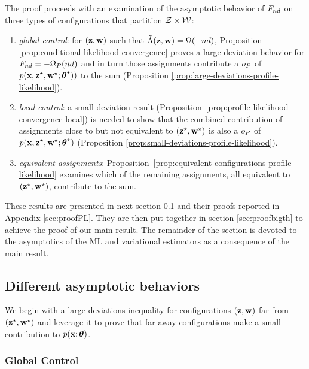 \documentclass[bj]{imsart}
\numberwithin{equation}{section}
\theoremstyle{plain}
\theoremstyle{remark}
\begin{document}
The proof proceeds with an examination of the asymptotic behavior of  $F_{nd}$ on three types of configurations that partition $\mathcal{Z}\times\mathcal{W}$:


\begin{enumerate}
\item  \emph{global control}: for $(\mathbf{z}, \mathbf{w})$ such that $\tilde{\Lambda}(\mathbf{z}, \mathbf{w}) = \Omega(-nd)$, Proposition \ref{prop:conditional-likelihood-convergence} proves a large deviation behavior for $F_{nd} = -\Omega_P(nd)$  and in turn those assignments contribute a $o_{P}$ of $p(\mathbf{x}, \mathbf{z}^\star, \mathbf{w}^\star; \boldsymbol{\theta}^\star))$ to the sum (Proposition \ref{prop:large-deviations-profile-likelihood}). 

\item \emph{local control}: a small deviation result (Proposition~\ref{prop:profile-likelihood-convergence-local}) is needed  to show that the combined contribution of assignments close to but not equivalent to $(\mathbf{z}^\star, \mathbf{w}^\star)$ is also a $o_{P}$ of $p(\mathbf{x}, \mathbf{z}^\star, \mathbf{w}^\star; \boldsymbol{\theta}^\star)$ (Proposition \ref{prop:small-deviations-profile-likelihood}). 
\item \emph{equivalent assignments}: Proposition~\ref{prop:equivalent-configurations-profile-likelihood} examines which of the remaining assignments, all equivalent to $(\mathbf{z}^\star, \mathbf{w}^\star)$, contribute to the sum.
\end{enumerate}
These results are presented in next section \ref{sec:technicalpropositions} and their proofs reported in Appendix \ref{sec:proofPL}. They are then put together in section \ref{sec:proofbigth} to achieve the proof of our main result. The remainder of the section is devoted to the asymptotics of the ML and variational estimators as a consequence of the main result.

\subsection{Different asymptotic behaviors}\label{sec:technicalpropositions}

We begin with a large deviations inequality for configurations $(\mathbf{z}, \mathbf{w})$ far from $(\mathbf{z}^\star, \mathbf{w}^\star)$ and leverage it to prove that far away configurations make a small contribution to $p(\mathbf{x}; \boldsymbol{\theta})$. 

\subsubsection{Global Control}
\end{document}
